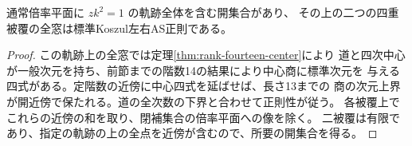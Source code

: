 \begin{corollary}\label{cor:rank-fifteen-near-collision}
通常倍率平面に $zk^2=1$ の軌跡全体を含む開集合があり、
その上の二つの四重被覆の全窓は標準Koszul左右AS正則である。
\end{corollary}
\begin{proof}
この軌跡上の全窓では定理\ref{thm:rank-fourteen-center}により
道と四次中心が一般次元を持ち、前節までの階数14の結果により中心商に標準次元を
与える四式がある。定階数の近傍に中心四式を延ばせば、長さ13までの
商の次元上界が開近傍で保たれる。道の全次数の下界と合わせて正則性が従う。
各被覆上でこれらの近傍の和を取り、閉補集合の倍率平面への像を除く。
二被覆は有限であり、指定の軌跡の上の全点を近傍が含むので、所要の開集合を得る。
\end{proof}
